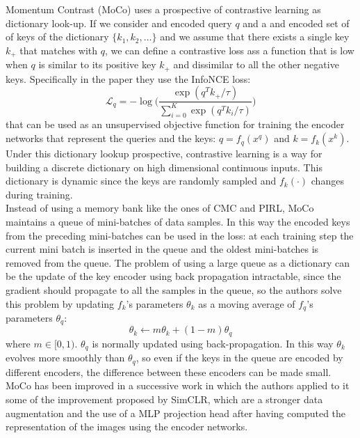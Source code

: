 Momentum Contrast (MoCo) \cite{he2020momentum} uses a prospective of contrastive learning as dictionary look-up. If we consider and encoded query $q$ and a and encoded set of of keys of the dictionary $\{k_1, k_2, \dots\}$ and we assume that there exists a single key $k_+$ that matches with $q$, we can define a contrastive loss ass a function that is low when $q$ is similar to its positive key $k_+$ and dissimilar to all the other negative keys. Specifically in the paper they use the InfoNCE loss: 
\[ \mathcal{L}_q = - \log\Bigg( \frac{\exp(q^Tk_+/\tau)}{\sum_{i=0}^K \exp(q^T k_i/\tau)}\Bigg)\]
that can be used as an unsupervised objective function for training the encoder networks that represent the queries and the keys: $q = f_q(x^q)$ and $k = f_k(x^k)$. Under this dictionary lookup prospective, contrastive learning is a way for building a discrete dictionary on high dimensional continuous inputs. This dictionary is dynamic since the keys are randomly sampled and $f_k(\cdot)$ changes during training.\\
Instead of using a memory bank like the ones of CMC and PIRL, MoCo maintains a queue of mini-batches of data samples. In this way the encoded keys from the preceding mini-batches can be used in the loss: at each training step the current mini batch is inserted in the queue and the oldest mini-batches is removed from the queue. The problem of using a large queue as a dictionary can be the update of the key encoder using back propagation intractable, since the gradient should propagate to all the samples in the queue, so the authors solve this problem by updating $f_k$'s parameters $\theta_k$ as a moving average of $f_q$'s parameters $\theta_q$:
\[\theta_k \leftarrow m\theta_k + (1-m)\theta_q \]
where $m \in [0,1)$. $\theta_q$ is normally updated using back-propagation. In this way $\theta_k$ evolves more smoothly than $\theta_q$, so even if the keys in the queue are encoded by different encoders, the difference between these encoders can be made small.\\
MoCo has been improved in a successive work \cite{chen2020simple} in which the authors applied to it some of the improvement proposed by SimCLR, which are a stronger data augmentation and the use of a MLP projection head after having computed the representation of the images using the encoder networks.